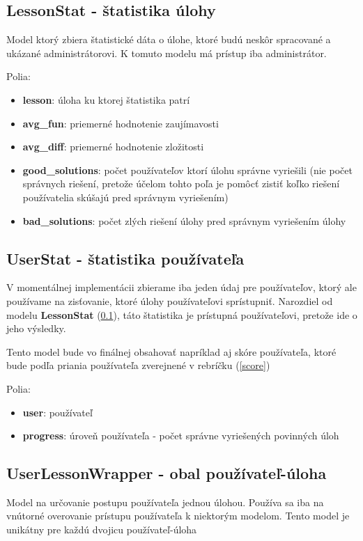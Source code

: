 \subsection{LessonStat - štatistika úlohy}
\label{modelLessonStat}
Model ktorý zbiera štatistické dáta o úlohe, ktoré budú neskôr spracované a ukázané administrátorovi.
K tomuto modelu má prístup iba administrátor.

Polia:
\begin{itemize}
\item \textbf{lesson}: úloha ku ktorej štatistika patrí
\item \textbf{avg\_fun}: priemerné hodnotenie zaujímavosti
\item \textbf{avg\_diff}: priemerné hodnotenie zložitosti
\item \textbf{good\_solutions}: počet používateľov ktorí úlohu správne vyriešili
  (nie počet správnych riešení, pretože účelom tohto poľa je pomôcť zistiť koľko riešení
  používatelia skúšajú pred správnym vyriešením)
\item \textbf{bad\_solutions}: počet zlých riešení úlohy pred správnym vyriešením úlohy
\end{itemize}

\subsection{UserStat - štatistika používateľa}
\label{modelUserStat}
V momentálnej implementácii zbierame iba jeden údaj pre používateľov, ktorý ale používame
na zisťovanie, ktoré úlohy používateľovi sprístupniť. Narozdiel od modelu \textbf{LessonStat} (\ref{modelLessonStat}),
táto štatistika je prístupná používateľovi, pretože ide o jeho výsledky.

Tento model bude vo finálnej obsahovať napríklad aj skóre používateľa, ktoré
bude podľa priania používateľa zverejnené v rebríčku (\ref{score})

Polia:
\begin{itemize}
\item \textbf{user}: používateľ
\item \textbf{progress}: úroveň používateľa - počet správne vyriešených povinných úloh
\end{itemize}

\subsection{UserLessonWrapper - obal používateľ-úloha}
\label{modelWrapper}
Model na určovanie postupu používateľa jednou úlohou. Používa sa iba na vnútorné
overovanie prístupu používateľa k niektorým modelom. Tento model je unikátny pre každú
dvojicu používateľ-úloha

